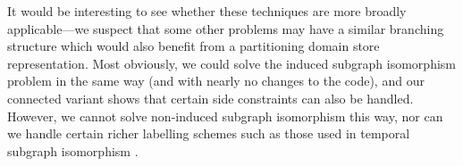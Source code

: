 \documentclass[letterpaper]{article}
\newcommand{\citep}[1]{\cite{#1}}
\begin{document}
It would be interesting to see whether these techniques are more broadly
applicable---we suspect that some other problems may have a similar branching
structure which would also benefit from a partitioning domain store
representation. Most obviously, we could solve the induced subgraph isomorphism
problem in the same way (and with nearly no changes to the code), and our
connected variant shows that certain side constraints can also be handled.
However, we cannot solve non-induced subgraph isomorphism this way, nor can
we handle certain richer labelling schemes such as those used in temporal
subgraph isomorphism \citep{DBLP:conf/asunam/RedmondC13}.



\end{document}
